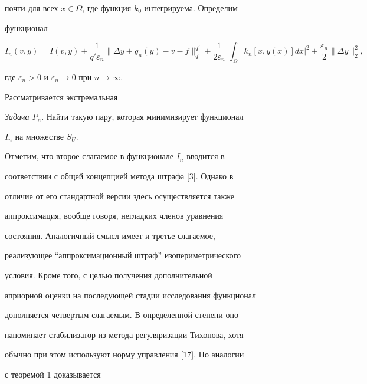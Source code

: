 почти для всех $x\in\Omega$, где функция $k_0$ интегрируема. Определим 


функционал 


$$ 


I_n(v,y)=I(v,y)+\frac{1}{q'\varepsilon_n}\|\Delta y+g_n(y) 


-v-f\|^{q'}_{q'}+\frac{1}{2\varepsilon_n}\bigg|\int_\Omega 


k_n[x,y(x)]dx\bigg|^2+\frac{\varepsilon_n}{2} 


\|\Delta y\|^2_2, 


$$ 


где $\varepsilon_n>0$ и $\varepsilon_n\to0$ при $n\to\infty$. 


 


Рассматривается экстремальная 


\medskip 


 


{\it Задача $P_n$}. Найти такую пару, которая минимизирует функционал 


$I_n$ на множестве $S_U$. 


\medskip 


 


Отметим, что второе слагаемое в функционале $I_n$ вводится в 


соответствии с общей концепцией метода штрафа [3]. Однако в 


отличие от его стандартной версии здесь осуществляется также 


аппроксимация, вообще говоря, негладких членов уравнения 


состояния. Аналогичный смысл имеет и третье слагаемое, 


реализующее ``аппроксимационный штраф'' изопериметрического 


условия. Кроме того, с целью получения дополнительной 


априорной оценки на последующей стадии исследования функционал 


дополняется четвертым слагаемым. В определенной степени оно 


напоминает стабилизатор из метода регуляризации Тихонова, хотя 


обычно при этом используют норму управления [17]. По аналогии 


с теоремой 1 доказывается 


 



